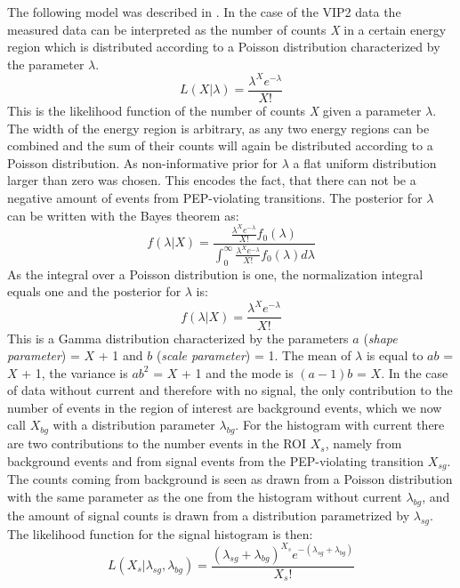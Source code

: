 The following model was described in \cite{Piscicchia2010}. In the case of the VIP2 data the measured data can be interpreted as the number of counts \textit{X} in a certain energy region which is distributed according to a Poisson distribution characterized by the parameter $\lambda$.
\begin{equation}
 L(X|\lambda) = \frac{\lambda^{X}e^{-\lambda}}{X!}
\end{equation} 
This is the likelihood function of the number of counts \textit{X} given a parameter $\lambda$. The width of the energy region is arbitrary, as any two energy regions can be combined and the sum of their counts will again be distributed according to a Poisson distribution. As non-informative prior for $\lambda$ a flat uniform distribution larger than zero was chosen. This encodes the fact, that there can not be a negative amount of events from PEP-violating transitions. The posterior for $\lambda$ can be written with the Bayes theorem as:
\begin{equation}
 f(\lambda|X) = \frac{\frac{\lambda^{X}e^{-\lambda}}{X!} f_{0}(\lambda)}{\int_{0}^{\infty} \frac{\lambda^{X}e^{-\lambda}}{X!} f_{0}(\lambda)d\lambda}
\end{equation} 
As the integral over a Poisson distribution is one, the normalization integral equals one and the posterior for $\lambda$ is:
\begin{equation}
 f(\lambda|X) = \frac{\lambda^{X}e^{-\lambda}}{X!}
 \label{eq:gammaDist}
\end{equation} 
This is a Gamma distribution characterized by the parameters $a$ (\textit{shape parameter}) = $X$ + 1 and $b$ (\textit{scale parameter}) = 1. The mean of $\lambda$ is equal to $ab$ = $X$ + 1, the variance is $ab^{2}$ = $X$ + 1 and the mode is $(a-1)b$ = $X$. In the case of data without current and therefore with no signal, the only contribution to the number of events in the region of interest are background events, which we now call $X_{bg}$ with a distribution parameter $\lambda_{bg}$. For the histogram with current there are two contributions to the number events in the ROI $X_{s}$, namely from background events and from signal events from the PEP-violating transition $X_{sg}$. The counts coming from background is seen as drawn from a Poisson distribution with the same parameter as the one from the histogram without current $\lambda_{bg}$, and the amount of signal counts is drawn from a distribution parametrized by $\lambda_{sg}$. The likelihood function for the signal histogram is then:
\begin{equation}
 L(X_{s}|\lambda_{sg},\lambda_{bg}) = \frac{(\lambda_{sg}+\lambda_{bg})^{X_{s}}e^{-(\lambda_{sg}+\lambda_{bg})}}{X_{s}!}
\end{equation} 
